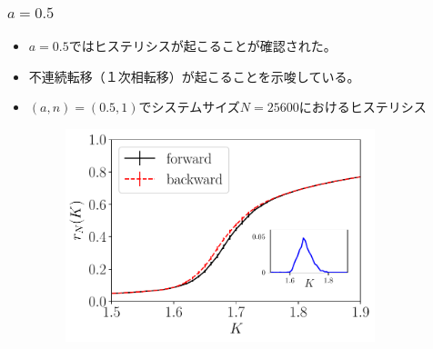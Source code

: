 \begin{frame}\frametitle{$a=0.5$}
  \begin{itemize}
    \item $a=0.5$ではヒステリシスが起こることが確認された。
    \item 不連続転移（１次相転移）が起こることを示唆している。
    \item $(a,n)=(0.5,1)$でシステムサイズ$N=25600$におけるヒステリシス
    \begin{figure}
      \includegraphics[width=9cm]{figs/hysteresis.pdf}
    \end{figure}
  \end{itemize}
\end{frame}


